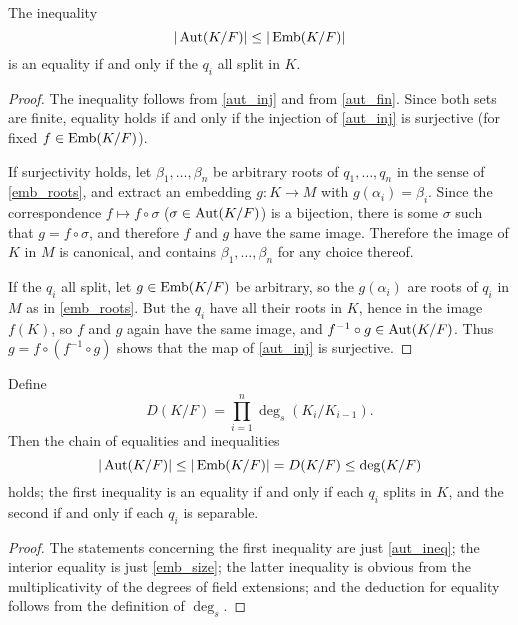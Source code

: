 \begin{proposition} The inequality
\begin{equation*}
|\operatorname{\text{Aut}}(K/F)| \leq |\operatorname{\text{Emb}}(K/F)|
\end{equation*}
is an equality if and only if the $q_i$ all split in $K$.
\label{aut_ineq}
\end{proposition}

\begin{proof} The inequality follows from \ref{aut_inj} and from \ref{aut_fin}.
Since both sets are finite, equality holds if and only if the injection of
\ref{aut_inj} is surjective (for fixed $f \in \operatorname{\text{Emb}}(K/F)$).

If surjectivity holds, let $\beta_1, \dots, \beta_n$ be arbitrary roots of
$q_1, \dots, q_n$ in the sense of \ref{emb_roots}, and extract an embedding $g
\colon K \to M$ with $g(\alpha_i) = \beta_i$.  Since the correspondence $f
\mapsto f \circ \sigma$ ($\sigma \in \operatorname{\text{Aut}}(K/F)$) is a bijection, there is some
$\sigma$ such that $g = f \circ \sigma$, and therefore $f$ and $g$ have the
same image.  Therefore the image of $K$ in $M$ is canonical, and contains
$\beta_1, \dots, \beta_n$ for any choice thereof.

If the $q_i$ all split, let $g \in \operatorname{\text{Emb}}(K/F)$ be arbitrary, so the
$g(\alpha_i)$ are roots of $q_i$ in $M$ as in \ref{emb_roots}.  But the $q_i$
have all their roots in $K$, hence in the image $f(K)$, so $f$ and $g$ again
have the same image, and $f^{-1} \circ g \in \operatorname{\text{Aut}}(K/F)$.  Thus $g = f \circ
(f^{-1} \circ g)$ shows that the map of \ref{aut_inj} is surjective.
\end{proof}

\begin{corollary} Define
\begin{equation*}
D(K/F) = \prod_{i = 1}^n \deg_s(K_i/K_{i - 1}).
\end{equation*}
Then the chain of equalities and inequalities
\begin{equation*}
|\operatorname{\text{Aut}}(K/F)| \leq |\operatorname{\text{Emb}}(K/F)| = D(K/F) \leq \deg(K/F)
\end{equation*}
holds; the first inequality is an equality if and only if each $q_i$ splits in
$K$, and the second if and only if each $q_i$ is separable.
\label{large_aut_ineq}
\end{corollary}

\begin{proof} The statements concerning the first inequality are just
\ref{aut_ineq}; the interior equality is just \ref{emb_size}; the latter
inequality is obvious from the multiplicativity of the degrees of field
extensions; and the deduction for equality follows from the definition of
$\deg_s$. \end{proof}

